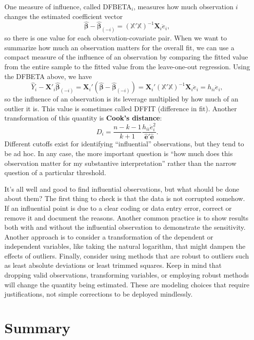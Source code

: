 \documentclass[
  13pt,
  letterpaper,
  DIV=11,
  numbers=noendperiod]{scrreprt}
\newcommand{\mb}{\bm}
\newcommand{\X}{\mb{X}}
\newcommand{\Xmat}{\mathbb{X}}
\newcommand{\bhat}{\widehat{\mb{\beta}}}
\theoremstyle{plain}
\theoremstyle{plain}
\theoremstyle{definition}
\theoremstyle{definition}
\theoremstyle{remark}
\begin{document}
One measure of influence, called DFBETA\(_i\), measures how much
observation \(i\) changes the estimated coefficient vector \[ 
\bhat - \bhat_{(-i)} = \left( \Xmat'\Xmat\right)^{-1}\X_i\ddot{e}_i,
\] so there is one value for each observation-covariate pair. When we
want to summarize how much an observation matters for the overall fit,
we can use a compact measure of the influence of an observation by
comparing the fitted value from the entire sample to the fitted value
from the leave-one-out regression. Using the DFBETA above, we have \[ 
\widehat{Y}_i - \X'_{i}\bhat_{(-i)} = \X_{i}'(\bhat -\bhat_{(-i)}) = \X_{i}'\left( \Xmat'\Xmat\right)^{-1}\X_i\ddot{e}_i = h_{ii}\ddot{e}_i,
\] so the influence of an observation is its leverage multiplied by how
much of an outlier it is. This value is sometimes called DFFIT
(difference in fit). Another transformation of this quantity is
\textbf{Cook's distance}: \[ 
D_i = \frac{n-k-1}{k+1}\frac{h_{ii}\ddot{e}_{i}^{2}}{\widehat{\mb{e}}'\widehat{\mb{e}}}.
\] Different cutoffs exist for identifying ``influential'' observations,
but they tend to be ad hoc. In any case, the more important question is
``how much does this observation matter for my substantive
interpretation'' rather than the narrow question of a particular
threshold.

It's all well and good to find influential observations, but what should
be done about them? The first thing to check is that the data is not
corrupted somehow. If an influential point is due to a clear coding or
data entry error, correct or remove it and document the reasons. Another
common practice is to show results both with and without the influential
observation to demonstrate the sensitivity. Another approach is to
consider a transformation of the dependent or independent variables,
like taking the natural logarithm, that might dampen the effects of
outliers. Finally, consider using methods that are robust to outliers
such as least absolute deviations or least trimmed squares. Keep in mind
that dropping valid observations, transforming variables, or employing
robust methods will change the quantity being estimated. These are
modeling choices that require justifications, not simple corrections to
be deployed mindlessly.

\section{Summary}\label{summary-6}
\end{document}
